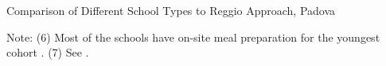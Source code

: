 \begin{table}[H]
\centering
\scriptsize
\begin{threeparttable}
\caption{Comparison of Different School Types to Reggio Approach, Padova}\label{tab:comparisonPad}
	
\begin{tablenotes}
\item Note: (6) Most of the schools have on-site meal preparation for the youngest cohort \citep{
Padova_Parma-Commune_2016}. (7) See \citet{Padova_Parma-Commune_2016}.
\end{tablenotes}
\end{threeparttable}
\end{table}
